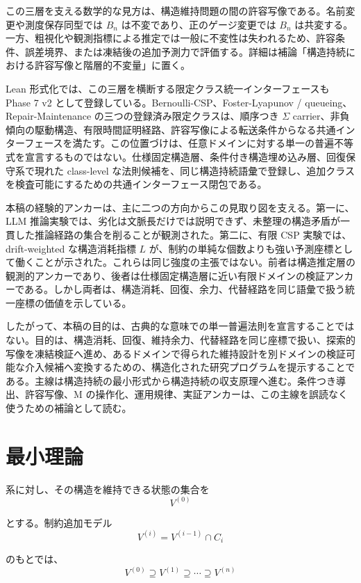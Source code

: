 \documentclass[12pt,a4paper]{article}
\begin{document}
この三層を支える数学的な見方は、構造維持問題の間の許容写像である。名前変更や測度保存同型では \(B_{n}\) は不変であり、正のゲージ変更では \(B_{n}\) は共変する。一方、粗視化や観測指標による推定では一般に不変性は失われるため、許容条件、誤差境界、または凍結後の追加予測力で評価する。詳細は補論「構造持続における許容写像と階層的不変量」に置く。

Lean 形式化では、この三層を横断する限定クラス統一インターフェースも Phase 7 v2 として登録している。Bernoulli-CSP、Foster-Lyapunov / queueing、Repair-Maintenance の三つの登録済み限定クラスは、順序つき \(\Sigma\) carrier、非負傾向の駆動構造、有限時間証明経路、許容写像による転送条件からなる共通インターフェースを満たす。この位置づけは、任意ドメインに対する単一の普遍不等式を宣言するものではない。仕様固定構造層、条件付き構造埋め込み層、回復保守系で現れた class-level な法則候補を、同じ構造持続語彙で登録し、追加クラスを検査可能にするための共通インターフェース閉包である。

本稿の経験的アンカーは、主に二つの方向からこの見取り図を支える。第一に、LLM 推論実験では、劣化は文脈長だけでは説明できず、未整理の構造矛盾が一貫した推論経路の集合を削ることが観測された。第二に、有限 CSP 実験では、drift-weighted な構造消耗指標 \(L\) が、制約の単純な個数よりも強い予測座標として働くことが示された。これらは同じ強度の主張ではない。前者は構造推定層の観測的アンカーであり、後者は仕様固定構造層に近い有限ドメインの検証アンカーである。しかし両者は、構造消耗、回復、余力、代替経路を同じ語彙で扱う統一座標の価値を示している。

したがって、本稿の目的は、古典的な意味での単一普遍法則を宣言することではない。目的は、構造消耗、回復、維持余力、代替経路を同じ座標で扱い、探索的写像を凍結検証へ進め、あるドメインで得られた維持設計を別ドメインの検証可能な介入候補へ変換するための、構造化された研究プログラムを提示することである。主線は構造持続の最小形式から構造持続の収支原理へ進む。条件つき導出、許容写像、M の操作化、運用規律、実証アンカーは、この主線を誤読なく使うための補論として読む。

\section{最小理論}\label{ux6700ux5c0fux7406ux8ad6}

系に対し、その構造を維持できる状態の集合を \[
V^{(0)}
\]

とする。制約追加モデル \[
V^{(i)} = V^{(i-1)} ∩ C_{i}
\]

のもとでは、 \[
V^{(0)} \supseteq V^{(1)} \supseteq \cdots \supseteq V^{(n)}
\]
\end{document}
